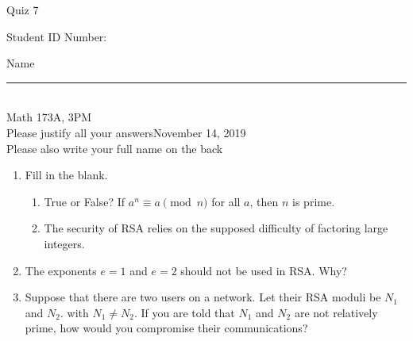 \documentclass[12pt]{article}
\begin{document}
\begin{flushleft} 
\centerline{\LARGE{Quiz 7}} 
\vspace{5 mm}
{Student ID Number:}\hfill  
{Name \rule {2 in}{0.01in}}\\
Math 173A, 3PM
\\
{Please justify all your answers}\hfill {November 14, 2019}
\\
{Please also write your full name on the back} 

\medskip
\end{flushleft}

\begin{enumerate}
	\item Fill in the blank.
	\begin{enumerate}
		\item True or False? If $a^n\equiv a\pmod{n}$ for all $a$, then $n$ is prime.
		\item The security of RSA relies on the supposed difficulty of factoring large integers.
	\end{enumerate}

	\item The exponents $e=1$ and $e=2$ should not be used in RSA. Why?
	\vfill
	\item Suppose that there are two users on a network. Let their RSA moduli be $N_1$ and $N_2$. with $N_1\neq N_2$. If you are told that $N_1$ and $N_2$ are not relatively prime, how would you compromise their communications?
	\vfill
\end{enumerate}

\end{document}
